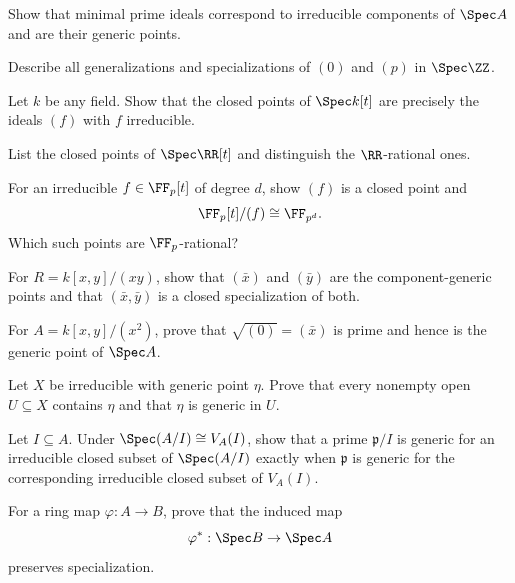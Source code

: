 \begin{exercise}
Show that minimal prime ideals correspond to irreducible components of $\Spec A$ and are
their generic points.
\end{exercise}

\begin{exercise}
Describe all generalizations and specializations of $(0)$ and $(p)$ in $\Spec\ZZ$.
\end{exercise}

\begin{exercise}
Let $k$ be any field.  Show that the closed points of $\Spec k[t]$ are precisely the
ideals $(f)$ with $f$ irreducible.
\end{exercise}

\begin{exercise}
List the closed points of $\Spec\RR[t]$ and distinguish the $\RR$-rational ones.
\end{exercise}

\begin{exercise}
For an irreducible $f\in\FF_p[t]$ of degree $d$, show $(f)$ is a closed point and
\[
\FF_p[t]/(f)\cong\FF_{p^d}.
\]
Which such points are $\FF_p$-rational?
\end{exercise}

\begin{exercise}
For $R=k[x,y]/(xy)$, show that $(\bar x)$ and $(\bar y)$ are the component-generic points
and that $(\bar x,\bar y)$ is a closed specialization of both.
\end{exercise}

\begin{exercise}
For $A=k[x,y]/(x^2)$, prove that $\sqrt{(0)}=(\bar x)$ is prime and hence is the generic
point of $\Spec A$.
\end{exercise}

\begin{exercise}
Let $X$ be irreducible with generic point $\eta$.  Prove that every nonempty open
$U\subseteq X$ contains $\eta$ and that $\eta$ is generic in $U$.
\end{exercise}

\begin{exercise}
Let $I\subseteq A$.  Under $\Spec(A/I)\cong V_A(I)$, show that a prime
$\mathfrak p/I$ is generic for an irreducible closed subset of $\Spec(A/I)$ exactly when
$\mathfrak p$ is generic for the corresponding irreducible closed subset of $V_A(I)$.
\end{exercise}

\begin{exercise}
For a ring map $\varphi:A\to B$, prove that the induced map
\[
\varphi^\ast:\Spec B\to\Spec A
\]
preserves specialization.
\end{exercise}
